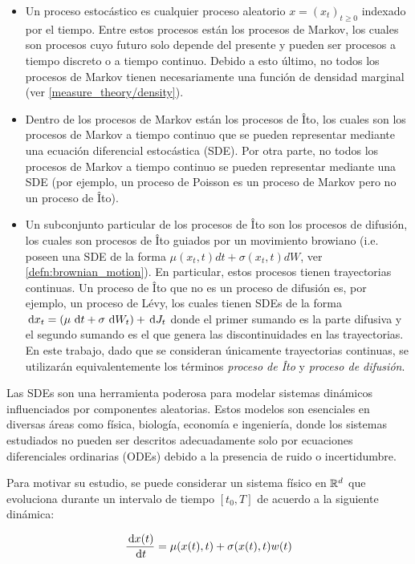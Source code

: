 \begin{itemize}
    \item Un proceso estocástico es cualquier proceso aleatorio $x=(x_t)_{t\geq 0}$ indexado por el tiempo. Entre estos procesos están los procesos de Markov, los cuales son procesos cuyo futuro solo depende del presente y pueden ser procesos a tiempo discreto o a tiempo continuo. Debido a esto último, no todos los procesos de Markov tienen necesariamente una función de densidad marginal (ver \autoref{measure_theory/density}).
    \item Dentro de los procesos de Markov están los procesos de Îto, los cuales son los procesos de Markov a tiempo continuo que se pueden representar mediante una ecuación diferencial estocástica (SDE). Por otra parte, no todos los procesos de Markov a tiempo continuo se pueden representar mediante una SDE (por ejemplo, un proceso de Poisson es un proceso de Markov pero no un proceso de Îto).
    \item Un subconjunto particular de los procesos de Îto son los procesos de difusión, los cuales son procesos de Îto guiados por un movimiento browiano (i.e. poseen una SDE de la forma $\mu(x_t,t)dt+\sigma(x_t,t)dW$, ver \autoref{defn:brownian_motion}). En particular, estos procesos tienen trayectorias continuas. Un proceso de Îto que no es un proceso de difusión es, por ejemplo, un proceso de Lévy, los cuales tienen SDEs de la forma $\,\operatorname{d}\! x_t = (\mu \,\operatorname{d}\! t + \sigma \,\operatorname{d}\! W_t) + \,\operatorname{d}\! J_t$ donde el primer sumando es la parte difusiva y el segundo sumando es el que genera las discontinuidades en las trayectorias. En este trabajo, dado que se consideran únicamente trayectorias continuas, se utilizarán equivalentemente los términos \textit{proceso de Îto} y \textit{proceso de difusión}.
\end{itemize}

Las SDEs son una herramienta poderosa para modelar sistemas dinámicos influenciados por componentes aleatorias. Estos modelos son esenciales en diversas áreas como física, biología, economía e ingeniería, donde los sistemas estudiados no pueden ser descritos adecuadamente solo por ecuaciones diferenciales ordinarias (ODEs) debido a la presencia de ruido o incertidumbre.

Para motivar su estudio, se puede considerar un sistema físico en $\mathbb{R}^d$ que evoluciona durante un intervalo de tiempo $[t_0,T]$ de acuerdo a la siguiente dinámica:

\begin{equation}
    \frac{\,\operatorname{d}\! x(t)}{\,\operatorname{d}\! t} = \mu(x(t),t) + \sigma(x(t),t)w(t)
    \label{eq:sde_as_derivative}
\end{equation}

